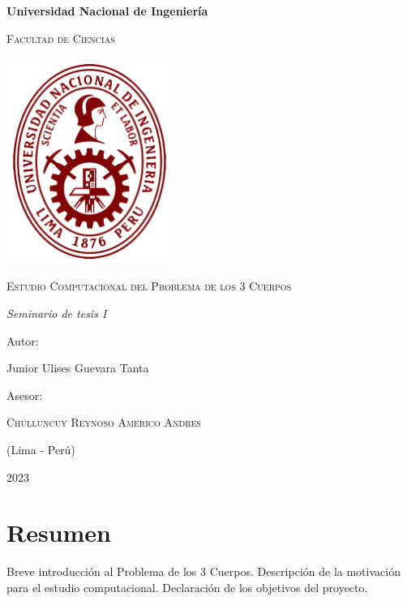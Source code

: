 \documentclass{article}
\begin{document}
    \begin{titlepage}
    \centering
    {\bfseries\LARGE Universidad Nacional de Ingeniería \par}
    \vspace{1cm}
    {\scshape\Large Facultad de Ciencias \par}
    \vspace{2cm}
    {\includegraphics[width=0.4\textwidth]{img/uni_logo.png}\par}
    \vspace{2cm}
    {\scshape\Large Estudio Computacional del Problema de los 3 Cuerpos \par}
    \vfill
    {\itshape\Large Seminario de tesis I \par}
    \vfill
    {\Large Autor: \par}
    {\Large Junior Ulises Guevara Tanta \par}
    \vfill
    {\Large Asesor: \par}
    {\scshape\Large Chulluncuy Reynoso  Americo Andres \par}
    \vfill
    {\Large (Lima - Perú) \par}
    {\Large 2023 \par}
    \end{titlepage}

\tableofcontents 


\section{Resumen}
Breve introducción al Problema de los 3 Cuerpos. \newline
Descripción de la motivación para el estudio computacional. \newline
Declaración de los objetivos del proyecto. \newline
\end{document}
